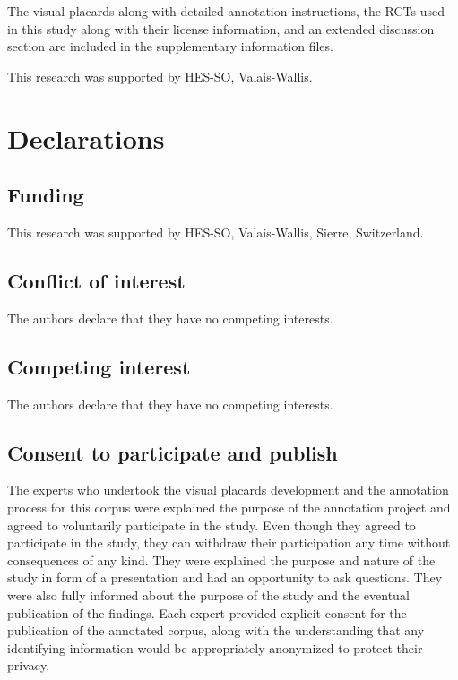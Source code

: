 \documentclass[sn-mathphys,Numbered]{sn-jnl}%
\theoremstyle{thmstyleone}%
\theoremstyle{thmstyletwo}%
\theoremstyle{thmstylethree}%
\begin{document}
%
The visual placards along with detailed annotation instructions, the RCTs used in this study along with their license information, and an extended discussion section are included in the supplementary information files.
%
%
%


This research was supported by HES-SO, Valais-Wallis. 

%
%
%
\section*{Declarations}
%
\subsection*{Funding}
%
This research was supported by HES-SO, Valais-Wallis, Sierre, Switzerland. 
%
%
%
\subsection*{Conflict of interest}
%
The authors declare that they have no competing interests.
%
%
%
\subsection*{Competing interest}
%
The authors declare that they have no competing interests.
%
%
%
%
%
%
%
\subsection*{Consent to participate and publish}
%
The experts who undertook the visual placards development and the annotation process for this corpus were explained the purpose of the annotation project and agreed to voluntarily participate in the study.
Even though they agreed to participate in the study, they can withdraw their participation any time without consequences of any kind.
They were explained the purpose and nature of the study in form of a presentation and had an opportunity to ask questions.
They were also fully informed about the purpose of the study and the eventual publication of the findings.
Each expert provided explicit consent for the publication of the annotated corpus, along with the understanding that any identifying information would be appropriately anonymized to protect their privacy. 
%
%
%
\end{document}
